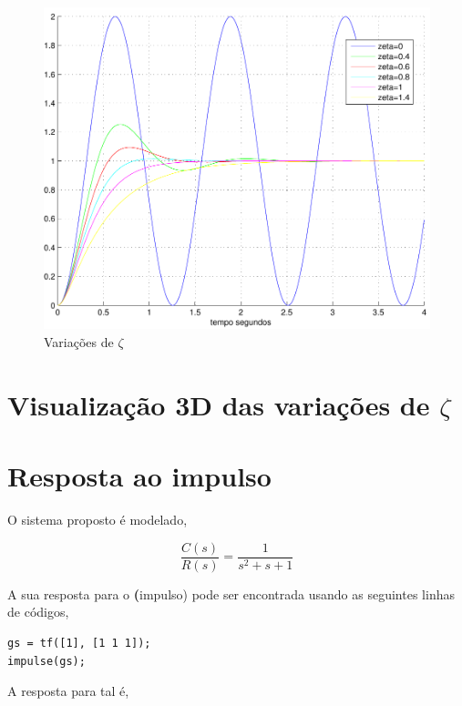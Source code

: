\documentclass[paper=a4, fontsize=11pt]{article}
\begin{document}
\begin{figure}
    \begin{center}
    \includegraphics[scale=.5]{q1ib.pdf}
    \caption{Variações de $\zeta$}
    \end{center}
\end{figure}

\section{Visualização 3D das variações de $\zeta$}

\section{Resposta ao impulso}

O sistema proposto é modelado,

\begin{equation}
    \frac{C(s)}{R(s)} = \frac{1}{s^2+s+1}
\end{equation}

A sua resposta para o \textbf(impulso) pode ser encontrada usando as 
seguintes linhas de códigos,

\begin{lstlisting}
gs = tf([1], [1 1 1]);
impulse(gs);
\end{lstlisting}

A resposta para tal é,
\end{document}
